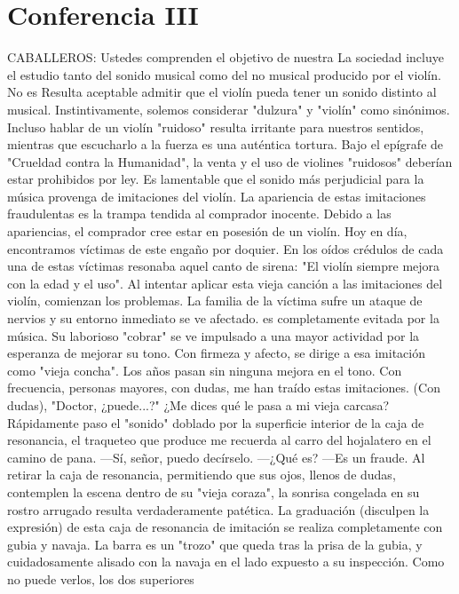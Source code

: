 \chapter*{Conferencia III}
CABALLEROS: Ustedes comprenden el objetivo de nuestra
La sociedad incluye el estudio tanto del sonido musical como del no musical producido por el violín. No es
Resulta aceptable admitir que el violín pueda tener un sonido distinto al musical. Instintivamente, solemos considerar "dulzura" y "violín" como sinónimos. Incluso hablar de un violín "ruidoso" resulta irritante para nuestros sentidos, mientras que escucharlo a la fuerza es una auténtica tortura. Bajo el epígrafe de "Crueldad contra la Humanidad", la venta y el uso de violines "ruidosos" deberían estar prohibidos por ley. Es lamentable que el sonido más perjudicial para la música provenga de imitaciones del violín. La apariencia de estas imitaciones fraudulentas es la trampa tendida al comprador inocente. Debido a las apariencias, el comprador cree estar en posesión de un violín. Hoy en día, encontramos víctimas de este engaño por doquier. En los oídos crédulos de cada una de estas víctimas resonaba aquel canto de sirena: "El violín siempre mejora con la edad y el uso". Al intentar aplicar esta vieja canción a las imitaciones del violín, comienzan los problemas. La familia de la víctima sufre un ataque de nervios y su entorno inmediato se ve afectado.
es completamente evitada por la música. Su laborioso "cobrar" se ve impulsado a una mayor actividad por la esperanza de mejorar su tono. Con firmeza y afecto, se dirige a esa imitación como "vieja concha". Los años pasan sin ninguna mejora en el tono. Con frecuencia, personas mayores, con dudas, me han traído estas imitaciones. (Con dudas), "Doctor, ¿puede...?"
¿Me dices qué le pasa a mi vieja carcasa? Rápidamente paso el "sonido" doblado por la superficie interior de la caja de resonancia, el traqueteo que produce me recuerda al carro del hojalatero en el camino de pana.
—Sí, señor, puedo decírselo. —¿Qué es? —Es un fraude.
Al retirar la caja de resonancia, permitiendo que sus ojos, llenos de dudas, contemplen la escena dentro de su "vieja coraza", la sonrisa congelada en su rostro arrugado resulta verdaderamente patética. La graduación (disculpen la expresión) de esta caja de resonancia de imitación se realiza completamente con gubia y navaja. La barra es un "trozo" que queda tras la prisa de la gubia, y cuidadosamente alisado con la navaja en el lado expuesto a su inspección. Como no puede verlos, los dos superiores
